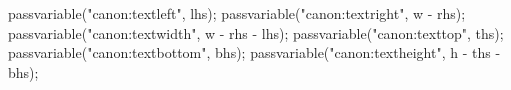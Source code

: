		passvariable("canon:textleft",   lhs);
		passvariable("canon:textright",  w - rhs);
		passvariable("canon:textwidth",  w - rhs - lhs);
		passvariable("canon:texttop",    ths);
		passvariable("canon:textbottom", bhs);
		passvariable("canon:textheight", h - ths - bhs);
	\stopMPcalculation

	\setuplayout[
		header=\bodyfontsize,
		headerdistance=\bodyfontsize, %
		top=0pt,
		topspace=\dimexpr\MPrunvar{canon:texttop}bp-\headerheight-\headerdistance\relax,
		footer=0pt,
		footerdistance=0pt,
		height=\dimexpr\MPrunvar{canon:textheight}bp
			+\headerheight+\headerdistance
			+\footerheight+\footerdistance\relax,
		backspace=\MPrunvar{canon:textleft}bp,
		margin=0pt, %
		width=\MPrunvar{canon:textwidth}bp,
	]

\stopenvironment


